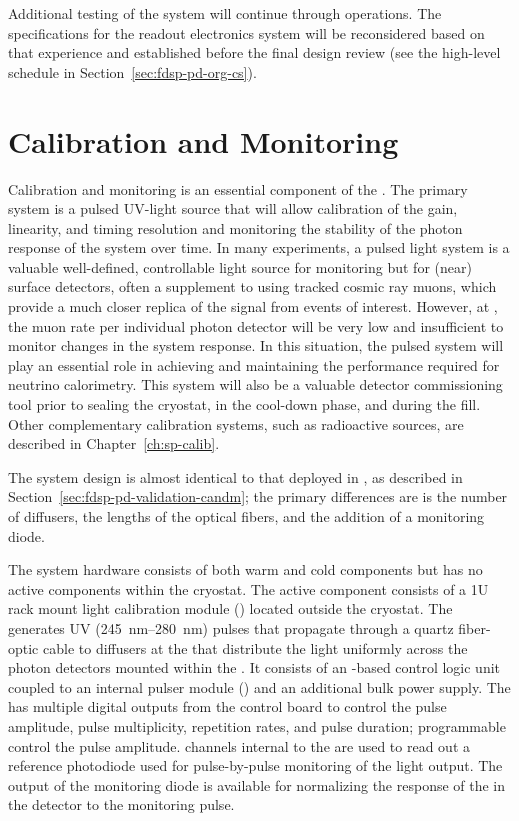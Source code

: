 Additional testing of the system will continue through  operations. The specifications for the readout electronics system will be reconsidered based on that experience and established before the  final design review (see the high-level schedule in Section~\ref{sec:fdsp-pd-org-cs}). 


\section{Calibration and Monitoring}
\label{sec:fdsp-pd-CandM}

Calibration and monitoring is an essential component of the .
The primary system is a pulsed UV-light source that will allow calibration of the  gain, linearity, and timing resolution and monitoring the stability of the photon response of the system over time.
In many experiments, a pulsed light system is a valuable well-defined, controllable light source for monitoring but for (near) surface detectors, often a supplement to using tracked cosmic ray muons, which provide a much closer replica of the signal from events of interest. 
However, at , the muon rate per individual photon detector will be very low and insufficient to monitor changes in the system response. In this situation, the pulsed system will play an essential role in achieving and maintaining the  performance required for neutrino calorimetry. 
This system will also be a valuable detector commissioning tool prior to sealing the cryostat, in the cool-down phase, and during the \lar fill.
Other complementary calibration systems, such as radioactive sources, are described in Chapter~\ref{ch:sp-calib}. 

The system design is almost identical to that deployed in , as described in Section~\ref{sec:fdsp-pd-validation-candm}; the primary differences are is the number of diffusers, the lengths of the optical fibers, and the addition of a monitoring diode.

The system hardware consists of both warm and cold components but has no active components within the cryostat. The active component consists of a 1U rack mount light calibration module () located outside the cryostat. The  generates UV (\SIrange{245}{280}{nm}) pulses that propagate through a quartz fiber-optic cable to diffusers at the  that distribute the light uniformly across the photon detectors mounted within the . 
It consists of an -based control logic unit coupled to an internal  pulser module () and an additional bulk power supply. 
The  has multiple digital outputs from the control board to control the pulse amplitude, pulse multiplicity, repetition rates, and pulse duration; programmable  control the  pulse amplitude.  channels internal to the  are used to read out a reference photodiode used for pulse-by-pulse monitoring of the  light output. The output of the monitoring diode is available for normalizing the response of the  in the detector to the monitoring pulse. 


